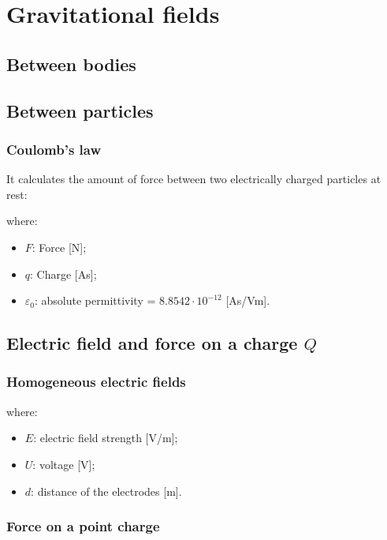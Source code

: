 \documentclass{article}
\begin{document}
\newpage
\section{Gravitational fields}
\subsection{Between bodies}

\subsection{Between particles}
\subsubsection{Coulomb's law}
It calculates the amount of force between two electrically charged
particles at rest:

where:
\begin{itemize}
    \item $F$: Force [N];
    \item $q$: Charge [As];
    \item $\varepsilon_0$: absolute permittivity = $8.8542\cdot 10^{-12}$ [As/Vm].
\end{itemize}

\subsection{Electric field and force on a charge $Q$}
\subsubsection{Homogeneous electric fields}

where:
\begin{itemize}
    \item $E$: electric field strength [V/m];
    \item $U$: voltage [V];
    \item $d$: distance of the electrodes [m].
\end{itemize}

\subsubsection{Force on a point charge}
\end{document}
